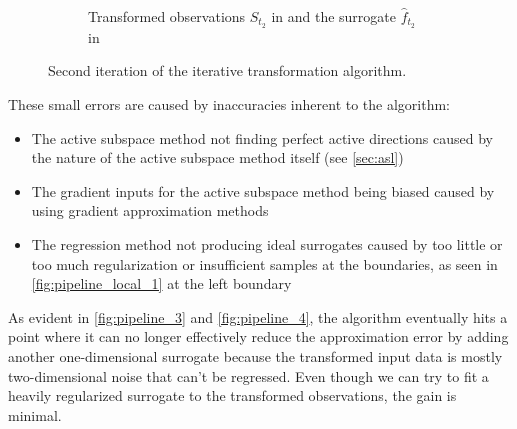 \documentclass[
  a4paper,  %
  twoside,  %
  bibliography=totoc,
  headsepline,
  cleardoublepage=empty,
  parskip=half,
  draft=false
]{scrbook}
\begin{document}
\begin{mdframed}[style=style]
\begin{figure}[H]
\begin{subfigure}{.5\textwidth}
  \caption{Transformed observations $S_{t_2}$ in \blue and the surrogate $\hat{f}_{t_2}$ in \reddot}
\label{fig:pipeline_local_2}
\end{subfigure}
\delimit
\caption{Second iteration of the iterative transformation algorithm.}
\label{fig:pipeline_2}
\end{figure}
\end{mdframed}
%
These small errors are caused by inaccuracies inherent to the algorithm:
\begin{itemize}
\item The active subspace method not finding perfect active directions caused by the nature of the active subspace method itself (see \cref{sec:asl})
\item The gradient inputs for the active subspace method being biased caused by using gradient approximation methods
\item The regression method not producing ideal surrogates caused by too little or too much regularization or insufficient samples at the boundaries, as seen in \cref{fig:pipeline_local_1} at the left boundary
\end{itemize}
%
As evident in \cref{fig:pipeline_3} and \cref{fig:pipeline_4}, the algorithm eventually hits a point where it can no longer effectively reduce the approximation error by adding another one-dimensional surrogate because the transformed input data is mostly two-dimensional noise that can't be regressed.
Even though we can try to fit a heavily regularized surrogate to the transformed observations, the gain is minimal.
\end{document}
